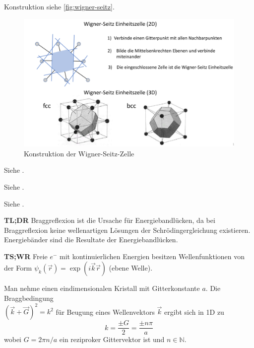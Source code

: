 Konstruktion siehe \autoref{fig:wigner-seitz}.
\begin{figure}[H]
    \centering
    \includegraphics[width=0.8\linewidth]{resources/15-06-2015/q33.png}
    \caption{Konstruktion der Wigner-Seitz-Zelle}
    \label{fig:wigner-seitz}
\end{figure}

\label{q:34}

Siehe .

\label{q:35}

Siehe .

\label{q:36}

Siehe .

\label{q:37}

\textbf{TL;DR} Braggreflexion ist die Ursache für Energiebandlücken, da bei Braggreflexion keine wellenartigen Lösungen der Schrödingergleichung existieren.
Energiebänder sind die Resultate der Energiebandlücken.

\textbf{TS;WR} Freie $e^-$ mit kontinuierlichen Energien besitzen Wellenfunktionen von der Form $\psi_{k}(\vec{r}) = \exp(i\vec{k}\vec{r})$ (ebene Welle).

Man nehme einen eindimensionalen Kristall mit Gitterkonstante $a$.
Die Braggbedingung\\$\left(\vec{k} + \vec{G}\right)^2 = k^2$ für Beugung eines Wellenvektors $\vec{k}$ ergibt sich in 1D zu
\begin{equation}
    k = \frac{\pm G}{2} = \frac{\pm n \pi}{a}
\end{equation}
wobei $G = 2\pi n/a$ ein reziproker Gittervektor ist und $n \in \mathbb{N}$.

